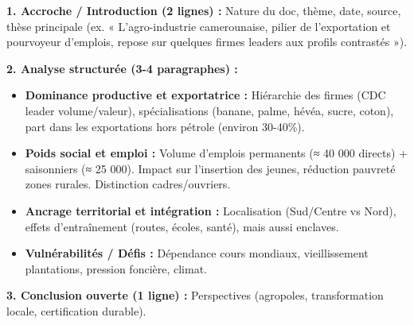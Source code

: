 \documentclass[11pt]{article}
\begin{document}
\begin{methode}
\textbf{1. Accroche / Introduction (2 lignes) :} Nature du doc, thème, date, source, thèse principale (ex. « L'agro-industrie camerounaise, pilier de l'exportation et pourvoyeur d'emplois, repose sur quelques firmes leaders aux profils contrastés »).\par
\textbf{2. Analyse structurée (3-4 paragraphes) :}
\begin{itemize}
    \item \textbf{Dominance productive et exportatrice :} Hiérarchie des firmes (CDC leader volume/valeur), spécialisations (banane, palme, hévéa, sucre, coton), part dans les exportations hors pétrole (environ 30-40\%).
    \item \textbf{Poids social et emploi :} Volume d'emplois permanents (≈ 40 000 directs) + saisonniers (≈ 25 000). Impact sur l'insertion des jeunes, réduction pauvreté zones rurales. Distinction cadres/ouvriers.
    \item \textbf{Ancrage territorial et intégration :} Localisation (Sud/Centre vs Nord), effets d'entraînement (routes, écoles, santé), mais aussi enclaves.
    \item \textbf{Vulnérabilités / Défis :} Dépendance cours mondiaux, vieillissement plantations, pression foncière, climat.
\end{itemize}
\textbf{3. Conclusion ouverte (1 ligne) :} Perspectives (agropoles, transformation locale, certification durable).
\end{methode}
\end{document}
